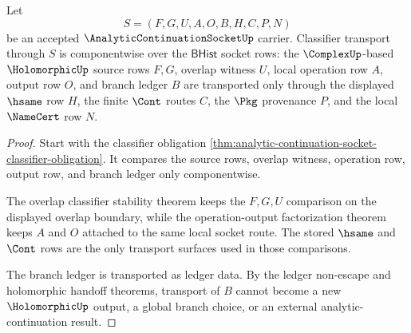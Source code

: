 \begin{theorem}
\label{thm:analytic-continuation-socket-classifier-transport}
Let
$$
S=(F,G,U,A,O,B,H,C,P,N)
$$
be an accepted $\AnalyticContinuationSocketUp$ carrier. Classifier transport through $S$ is componentwise over the $\mathsf{BHist}$ socket rows: the $\ComplexUp$-based $\HolomorphicUp$ source rows $F,G$, overlap witness $U$, local operation row $A$, output row $O$, and branch ledger $B$ are transported only through the displayed $\hsame$ row $H$, the finite $\Cont$ routes $C$, the $\Pkg$ provenance $P$, and the local $\NameCert$ row $N$.
\end{theorem}
\begin{proof}
Start with the classifier obligation \autoref{thm:analytic-continuation-socket-classifier-obligation}. It compares the source rows, overlap witness, operation row, output row, and branch ledger only componentwise.

The overlap classifier stability theorem keeps the $F,G,U$ comparison on the displayed overlap boundary, while the operation-output factorization theorem keeps $A$ and $O$ attached to the same local socket route. The stored $\hsame$ and $\Cont$ rows are the only transport surfaces used in those comparisons.

The branch ledger is transported as ledger data. By the ledger non-escape and holomorphic handoff theorems, transport of $B$ cannot become a new $\HolomorphicUp$ output, a global branch choice, or an external analytic-continuation result.
\end{proof}

